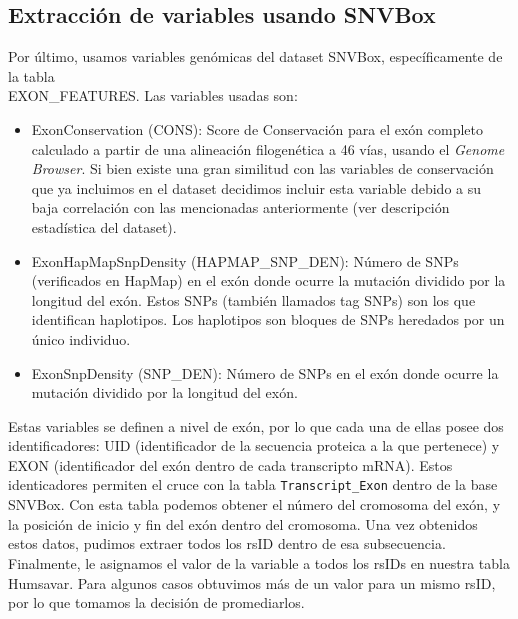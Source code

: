  

\subsection{Extracción de variables usando SNVBox}

Por último, usamos variables genómicas del dataset SNVBox, específicamente de la tabla \\ EXON\_FEATURES. Las variables usadas son:
\begin{itemize}
    \item ExonConservation (CONS): Score de Conservación para el exón completo calculado a partir de una alineación filogenética a 46 vías, usando el \textit{Genome Browser}. Si bien existe una gran similitud con las variables de conservación que ya incluimos en el dataset decidimos incluir esta variable debido a su baja correlación con las mencionadas anteriormente (ver descripción estadística del dataset).
    \item ExonHapMapSnpDensity (HAPMAP\_SNP\_DEN): Número de SNPs (verificados en HapMap) en el exón donde ocurre la mutación dividido por la longitud del exón. Estos SNPs (también llamados tag SNPs) son los que identifican haplotipos. Los haplotipos son bloques de SNPs heredados por un único individuo.
    \item ExonSnpDensity (SNP\_DEN): Número de SNPs en el exón donde ocurre la mutación dividido por la longitud del exón.
\end{itemize}

Estas variables se definen a nivel de exón, por lo que cada una de ellas posee dos identificadores: UID (identificador de la secuencia proteica a la que pertenece) y EXON (identificador del exón dentro de cada transcripto mRNA). Estos identicadores permiten el cruce con la tabla \texttt{Transcript\_Exon} dentro de la base SNVBox. Con esta tabla podemos obtener el número del cromosoma del exón, y la posición de inicio y fin del exón dentro del cromosoma. Una vez obtenidos estos datos, pudimos extraer todos los rsID dentro de esa subsecuencia. Finalmente, le asignamos el valor de la variable a todos los rsIDs en nuestra tabla Humsavar. Para algunos casos obtuvimos más de un valor para un mismo rsID, por lo que tomamos la decisión de promediarlos.

